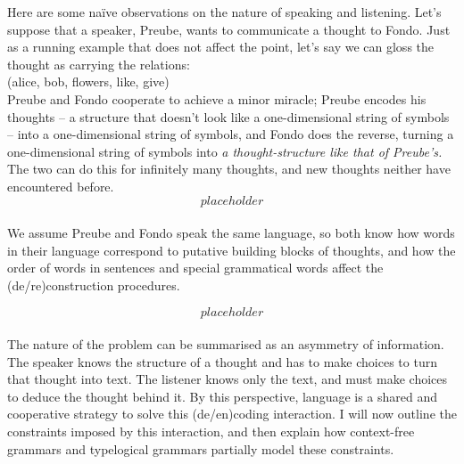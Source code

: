 Here are some na\"{i}ve observations on the nature of speaking and listening. Let's suppose that a speaker, Preube, wants to communicate a thought to Fondo. Just as a running example that does not affect the point, let's say we can gloss the thought as carrying the relations:\\

(alice, bob, flowers, like, give)\\

Preube and Fondo cooperate to achieve a minor miracle; Preube encodes his thoughts -- a structure that doesn't look like a one-dimensional string of symbols -- into a one-dimensional string of symbols, and Fondo does the reverse, turning a one-dimensional string of symbols into \emph{a thought-structure like that of Preube's.} The two can do this for infinitely many thoughts, and new thoughts neither have encountered before.\\

\[placeholder\]\\

We assume Preube and Fondo speak the same language, so both know how words in their language correspond to putative building blocks of thoughts, and how the order of words in sentences and special grammatical words affect the (de/re)construction procedures.

\[placeholder\]\\

The nature of the problem can be summarised as an asymmetry of information. The speaker knows the structure of a thought and has to make choices to turn that thought into text. The listener knows only the text, and must make choices to deduce the thought behind it. By this perspective, language is a shared and cooperative strategy to solve this (de/en)coding interaction. I will now outline the constraints imposed by this interaction, and then explain how context-free grammars and typelogical grammars partially model these constraints.

